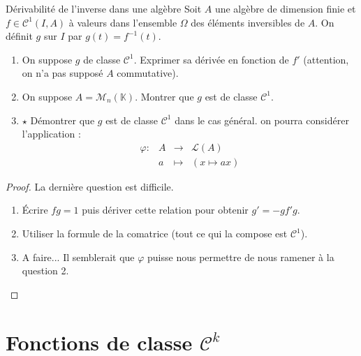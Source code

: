 \documentclass[french,a4paper]{article}
\newcommand{\K}{\mathbb{K}}
\newcommand{\inv}{^{-1}}
\theoremstyle{plain}
\theoremstyle{definition}
\theoremstyle{remark}
\begin{document}
\begin{ex}[Moulin.FV.13]{Dérivabilité de l'inverse dans une algèbre}
	Soit $A$ une algèbre de dimension finie et $f\in\mathcal{C}^1(I,A)$ à valeurs dans l'ensemble $\Omega$ des éléments inversibles de $A$. On définit $g$ sur $I$ par $g(t)=f\inv(t)$.
	\begin{enumerate}
		\item On suppose $g$ de classe $\mathcal{C}^1$. Exprimer sa dérivée en fonction de $f'$ (attention, on n'a pas supposé $A$ commutative).
		\item On suppose $A=\mathcal{M}_n(\K)$. Montrer que $g$ est de classe $\mathcal{C}^1$.
		\item $\star$ Démontrer que $g$ est de classe $\mathcal{C}^1$ dans le cas général. on pourra considérer l'application : $$\begin{array}{lrcl}
			\varphi:&A&\longrightarrow&\mathcal{L}(A) \\
			&a&\longmapsto&(x\mapsto ax)
		\end{array}$$
	\end{enumerate}
\end{ex}
\begin{proof}
	La dernière question est difficile.
	\begin{enumerate}
		\item Écrire $fg=1$ puis dériver cette relation pour obtenir $g'=-gf'g$.
		\item Utiliser la formule de la comatrice (tout ce qui la compose est $\mathcal{C}^1$).
		\item A faire... Il semblerait que $\varphi$ puisse nous permettre de nous ramener à la question 2.
	\end{enumerate}
\end{proof}

\section{Fonctions de classe $\mathcal{C}^k$}
\end{document}
